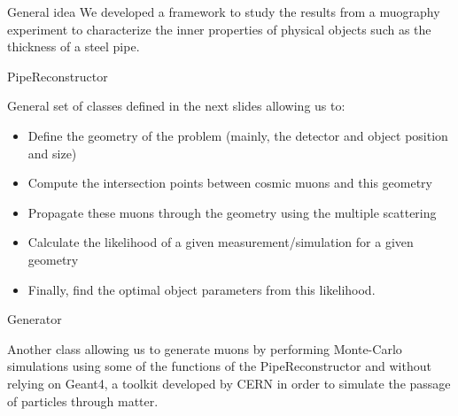 \documentclass[8 pt]{beamer}
\begin{document}
\begin{frame}{General idea}
We developed a framework to study the results from a muography experiment to characterize the inner properties of physical objects such as the thickness of a steel pipe. \vfill
\begin{exampleblock}{} PipeReconstructor \end{exampleblock}
\justifying
General set of classes defined in the next slides allowing us to:
\begin{itemize}
\justifying
\item Define the geometry of the problem (mainly, the detector and object position and size)
\item Compute the intersection points between cosmic muons and this geometry
\item Propagate these muons through the geometry using the multiple scattering
\item Calculate the likelihood of a given measurement/simulation for a given geometry
\item Finally, find the optimal object parameters from this likelihood.
\end{itemize} \vfill

\begin{exampleblock}{} Generator \end{exampleblock}
\justifying
Another class allowing us to generate muons by performing Monte-Carlo simulations using some of the functions of the PipeReconstructor and without relying on Geant4, a toolkit developed by CERN in order to simulate the passage of particles through matter. \vfill

\end{frame}
\end{document}

